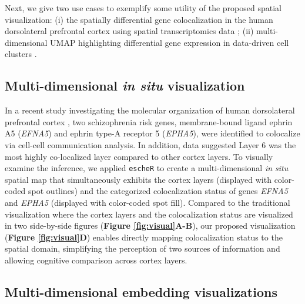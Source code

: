 \documentclass[10pt,twocolumn]{article}
\begin{document}
Next, we give two use cases to exemplify some utility of the proposed spatial visualization: (i) the spatially differential gene colocalization in the human dorsolateral prefrontal cortex using spatial transcriptomics data \cite{huukimyers_2023}; (ii) multi-dimensional UMAP highlighting differential gene expression in data-driven cell clusters \cite{freytag_2020}. 

\subsection{Multi-dimensional \textit{in situ} visualization}
In a recent study investigating the molecular organization of human dorsolateral prefrontal cortex \cite{huukimyers_2023}, two schizophrenia risk genes, membrane-bound ligand ephrin A5 (\textit{EFNA5}) and ephrin type-A receptor 5 (\textit{EPHA5}), were identified to colocalize via cell-cell communication analysis. In addition, data suggested Layer 6 was the most highly co-localized layer compared to other cortex layers. To visually examine the inference, we applied \texttt{escheR} to create a multi-dimensional \textit{in situ} spatial map that simultaneously exhibits the cortex layers (displayed with color-coded spot outlines) and the categorized colocalization status of genes \textit{EFNA5} and \textit{EPHA5} (displayed with color-coded spot fill). Compared to the traditional visualization where the cortex layers and the colocalization status are visualized in two side-by-side figures (\textbf{Figure \ref{fig:visual}A-B}), our proposed visualization (\textbf{Figure \ref{fig:visual}D}) enables directly mapping colocalization status to the spatial domain, simplifying the perception of two sources of information and allowing cognitive comparison across cortex layers. 

\subsection{Multi-dimensional embedding visualizations}
\end{document}
